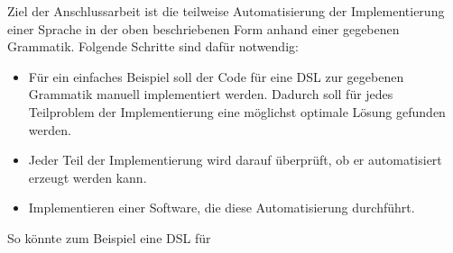 Ziel der Anschlussarbeit ist die teilweise Automatisierung der Implementierung einer Sprache in der oben beschriebenen Form anhand einer gegebenen Grammatik. Folgende Schritte sind dafür notwendig:
\begin{itemize}
	\item Für ein einfaches Beispiel soll der Code für eine DSL zur gegebenen Grammatik manuell implementiert werden. Dadurch soll für jedes Teilproblem der Implementierung eine möglichst optimale Lösung gefunden werden.
	\item Jeder Teil der Implementierung wird darauf überprüft, ob er automatisiert erzeugt werden kann.
	\item Implementieren einer Software, die diese Automatisierung durchführt.
\end{itemize}

So könnte zum Beispiel eine DSL für